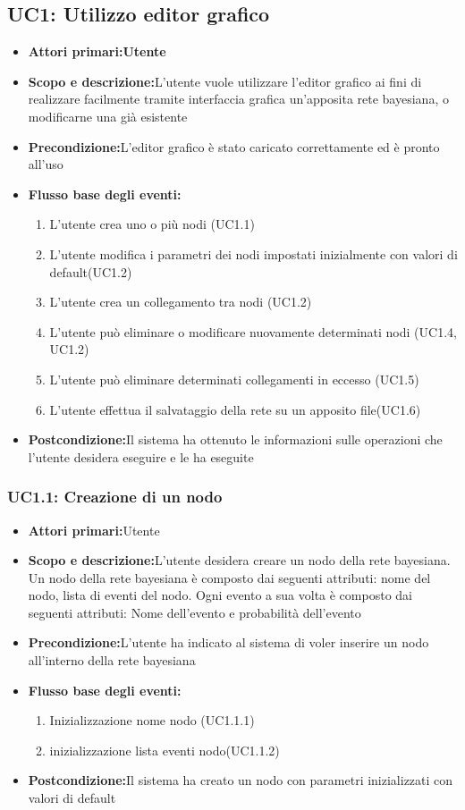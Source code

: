 \subsection{UC1: Utilizzo editor grafico}

\begin{itemize}
	\item{\textbf{Attori primari:Utente}}
	\item{\textbf{Scopo e descrizione:}L'utente vuole utilizzare l'editor grafico ai fini di realizzare facilmente tramite interfaccia grafica un'apposita rete bayesiana, o modificarne una già esistente}
	\item{\textbf{Precondizione:}L'editor grafico è stato caricato correttamente ed è pronto all'uso}
	\item{\textbf{Flusso base degli eventi:}
		\begin{enumerate}
			\item{L'utente crea uno o più nodi (UC1.1)}
			\item{L'utente modifica i parametri dei nodi impostati inizialmente con valori di default(UC1.2)}
			\item{L'utente crea un collegamento tra nodi (UC1.2)}
			\item{L'utente può eliminare o modificare nuovamente determinati nodi (UC1.4, UC1.2)}
			\item{L'utente può eliminare determinati collegamenti in eccesso (UC1.5)}
			\item{L'utente effettua il salvataggio della rete su un apposito file(UC1.6)}
		\end{enumerate}
	}
	\item{\textbf{Postcondizione:}Il sistema ha ottenuto le informazioni sulle operazioni che l'utente desidera eseguire e le ha eseguite}
\end{itemize}
\subsubsection{UC1.1: Creazione di un nodo}
\begin{itemize}
	\item{\textbf{Attori primari:}Utente}
	\item{\textbf{Scopo e descrizione:}L'utente desidera creare un nodo della rete bayesiana. Un nodo della rete bayesiana è composto dai seguenti attributi: nome del nodo, lista di eventi del nodo. Ogni evento a sua volta è composto dai seguenti attributi: Nome dell'evento e probabilità dell'evento}
	\item{\textbf{Precondizione:}L'utente ha indicato al sistema di voler inserire un nodo all'interno della rete bayesiana}
	\item{\textbf{Flusso base degli eventi:}}
		\begin{enumerate}
			\item{Inizializzazione nome nodo (UC1.1.1)}
			\item{inizializzazione lista eventi nodo(UC1.1.2)}
		\end{enumerate}
	\item{\textbf{Postcondizione:}Il sistema ha creato un nodo con parametri inizializzati con valori di default}
\end{itemize}
